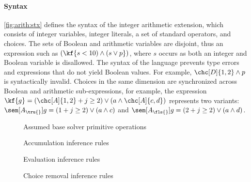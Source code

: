 \paragraph{Syntax}
%
\autoref{fig:arith:stx} defines the syntax of the integer arithmetic extension,
which consists of integer variables, integer literals, a set of standard
operators, and choices.
%
The sets of Boolean and arithmetic variables are disjoint, thus an expression
such as $(\kf{s < 10) \wedge (s \vee p})$, where $s$ occurs as both an integer
and Boolean variable is disallowed.
%
The syntax of the language prevents type errors and expressions that do not
yield Boolean values. For example, $\chc[D]{1,2} \wedge p$ is syntactically
invalid.
%
%
%
Choices in the same dimension are synchronized across Boolean and arithmetic
sub-expressions, for example, the expression
%
$\kf{g} = (\chc[A]{1, 2} + j \geq 2) \vee (a \wedge \chc[A]{c,d})$
%
represents two variants:
%
$\sem[A_{\tru{}}]{g} = (1 + j \geq 2) \vee (a \wedge c)$ and
$\sem[A_{\fls{}}]{g} = (2 + j \geq 2) \vee (a \wedge d)$.

\begin{figure}
  
  \caption{Assumed base solver primitive operations}%
  \label{fig:vsmt:inf:prim}
\end{figure}
%
\begin{figure}
  
  \caption{Accumulation inference rules}%
  \label{fig:vsmt:inf:acc}
\end{figure}
%
\begin{figure}
  
  \caption{Evaluation inference rules}%
  \label{fig:vsmt:inf:eval}
\end{figure}
%
\begin{figure}
  
  \caption{Choice removal inference rules}%
  \label{fig:vsmt:inf:chc}
\end{figure}


